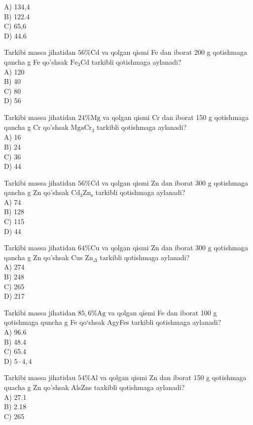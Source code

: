 A) 134,4\\
B) 122.4\\
C) 65,6\\
D) 44.6
  \item Tarkibi massa jihatidan $56 \% \mathrm{Cd}$ va qolgan qismi Fe dan iborat 200 g qotishmaga qancha g Fe qo'shsak $\mathrm{Fe}_{3} \mathrm{Cd}$ tarkibli qotishmaga aylanadi?\\
A) 120\\
B) 40\\
C) 80\\
D) 56
  \item Tarkibi massa jihatidan $24 \% \mathrm{Mg}$ va qolgan qismi Cr dan iborat 150 g qotishmaga qancha g Cr qo'shsak $\mathrm{MgaCr}_{3}$ tarkibli qotishmaga aylanadi?\\
A) 16\\
B) 24\\
C) 36\\
D) 44
  \item Tarkibi massa jihatidan $56 \% \mathrm{Cd}$ va qolgan qismi Zn dan iborat 300 g qotishmaga qancha g Zn qo'shsak $\mathrm{Cd}_{3} \mathrm{Zn}_{\mathrm{s}}$ tarkibli qotishmaga aylanadi?\\
A) 74\\
B) 128\\
C) 115\\
D) 44
  \item Tarkibi massa jihatidan $64 \% \mathrm{Cu}$ va qolgan qismi Zn dan iborat 300 g qotishmaga qancha g Zn qo'shsak Cus $\mathrm{Zn}_{\Delta}$ tarkibli qotishmaga aylanadi?\\
A) 274\\
B) 248\\
C) 265\\
D) 217
  \item Tarkibi massa jihatidan $85,6 \% \mathrm{Ag}$ va qolgan qismi Fe dan iborat 100 g qotishmaga quncha g Fe qo`shsak AgyFes tarkibli qotishmaga aylanadi?\\
A) 96.6\\
B) 48.4\\
C) 65.4\\
D) $5 \cdot 4,4$
  \item Tarkibi massa jihatidau $54 \% \mathrm{Al}$ va qolgan qismi Zn dan iborat 150 g qotishmaga quacha g Zn qo'shsak AlsZns taxkibli qotishmaga aylanadi?\\
A) 27.1\\
B) 2.18\\
C) 265\\
